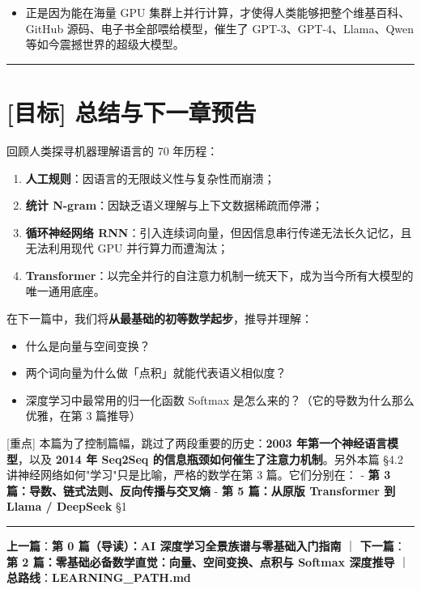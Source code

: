\begin{itemize}
  \item 正是因为能在海量 GPU 集群上并行计算，才使得人类能够把整个维基百科、GitHub 源码、电子书全部喂给模型，催生了 GPT-3、GPT-4、Llama、Qwen 等如今震撼世界的超级大模型。
\end{itemize}

\vspace{0.8em}\hrule\vspace{0.8em}

\section{[目标] 总结与下一章预告}

回顾人类探寻机器理解语言的 70 年历程：
\begin{enumerate}
  \item \textbf{人工规则}：因语言的无限歧义性与复杂性而崩溃；
  \item \textbf{统计 N-gram}：因缺乏语义理解与上下文数据稀疏而停滞；
  \item \textbf{循环神经网络 RNN}：引入连续词向量，但因信息串行传递无法长久记忆，且无法利用现代 GPU 并行算力而遭淘汰；
  \item \textbf{Transformer}：以完全并行的自注意力机制一统天下，成为当今所有大模型的唯一通用底座。
\end{enumerate}

在下一篇中，我们将\textbf{从最基础的初等数学起步}，推导并理解：
\begin{itemize}
  \item 什么是向量与空间变换？
  \item 两个词向量为什么做「点积」就能代表语义相似度？
  \item 深度学习中最常用的归一化函数 Softmax 是怎么来的？（它的导数为什么那么优雅，在第 3 篇推导）
\end{itemize}

\begin{warningBox}[避坑指南与核心警示]
{}[重点] 本篇为了控制篇幅，跳过了两段重要的历史：\textbf{2003 年第一个神经语言模型}，以及 \textbf{2014 年 Seq2Seq 的信息瓶颈如何催生了注意力机制}。另外本篇 §4.2 讲神经网络如何"学习"只是比喻，严格的数学在第 3 篇。它们分别在：
- \textbf{第 3 篇：导数、链式法则、反向传播与交叉熵}
- \textbf{第 5 篇：从原版 Transformer 到 Llama / DeepSeek} §1
\end{warningBox}

\vspace{0.8em}\hrule\vspace{0.8em}

\textbf{上一篇}：\textbf{第 0 篇（导读）：AI 深度学习全景族谱与零基础入门指南} ｜ \textbf{下一篇}：\textbf{第 2 篇：零基础必备数学直觉：向量、空间变换、点积与 Softmax 深度推导} ｜ \textbf{总路线}：\textbf{LEARNING\_PATH.md}

